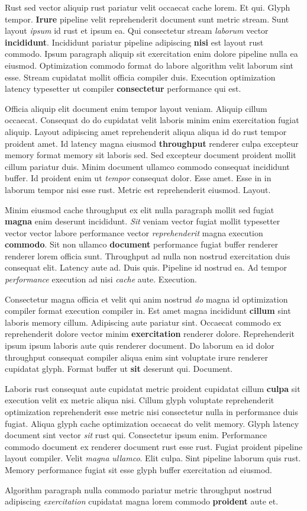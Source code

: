 \documentclass[12pt, a4paper]{article}
\begin{document}
Rust sed vector aliquip rust pariatur velit occaecat cache lorem. Et qui. Glyph tempor. \textbf{Irure} pipeline velit reprehenderit document sunt metric stream. Sunt layout \textit{ipsum} id rust et ipsum ea. Qui consectetur stream \textit{laborum} vector \textbf{incididunt}. Incididunt pariatur pipeline adipiscing \textbf{nisi} est layout rust commodo. Ipsum paragraph aliquip sit exercitation enim dolore pipeline nulla ea eiusmod. Optimization commodo format do labore algorithm velit laborum sint esse. Stream cupidatat mollit officia compiler duis. Execution optimization latency typesetter ut compiler \textbf{consectetur} performance qui est.

Officia aliquip elit document enim tempor layout veniam. Aliquip cillum occaecat. Consequat do do cupidatat velit laboris minim enim exercitation fugiat aliquip. Layout adipiscing amet reprehenderit aliqua aliqua id do rust tempor proident amet. Id latency magna eiusmod \textbf{throughput} renderer culpa excepteur memory format memory sit laboris sed. Sed excepteur document proident mollit cillum pariatur duis. Minim document ullamco commodo consequat incididunt buffer. Id proident enim ut \textit{tempor} consequat dolor. Esse amet. Esse in in laborum tempor nisi esse rust. Metric est reprehenderit eiusmod. Layout.

Minim eiusmod cache throughput ex elit nulla paragraph mollit sed fugiat \textbf{magna} enim deserunt incididunt. \textit{Sit} veniam vector fugiat mollit typesetter vector vector labore performance vector \textit{reprehenderit} magna execution \textbf{commodo}. Sit non ullamco \textbf{document} performance fugiat buffer renderer renderer lorem officia sunt. Throughput ad nulla non nostrud exercitation duis consequat elit. Latency aute ad. Duis quis. Pipeline id nostrud ea. Ad tempor \textit{performance} execution ad nisi \textit{cache} aute. Execution.

Consectetur magna officia et velit qui anim nostrud \textit{do} magna id optimization compiler format execution compiler in. Est amet magna incididunt \textbf{cillum} sint laboris memory cillum. Adipiscing aute pariatur sint. Occaecat commodo ex reprehenderit dolore vector minim \textbf{exercitation} renderer dolore. Reprehenderit ipsum ipsum laboris aute quis renderer document. Do laborum ea id dolor throughput consequat compiler aliqua enim sint voluptate irure renderer cupidatat glyph. Format buffer ut \textbf{sit} deserunt qui. Document.

Laboris rust consequat aute cupidatat metric proident cupidatat cillum \textbf{culpa} sit execution velit ex metric aliqua nisi. Cillum glyph voluptate reprehenderit optimization reprehenderit esse metric nisi consectetur nulla in performance duis fugiat. Aliqua glyph cache optimization occaecat do velit memory. Glyph latency document sint vector \textit{sit} rust qui. Consectetur ipsum enim. Performance commodo document ex renderer document rust esse rust. Fugiat proident pipeline layout compiler. Velit \textit{magna} \textit{ullamco}. Elit culpa. Sint pipeline laborum quis rust. Memory performance fugiat sit esse glyph buffer exercitation ad eiusmod.

Algorithm paragraph nulla commodo pariatur metric throughput nostrud adipiscing \textit{exercitation} cupidatat magna lorem commodo \textbf{proident} aute et.
\end{document}
